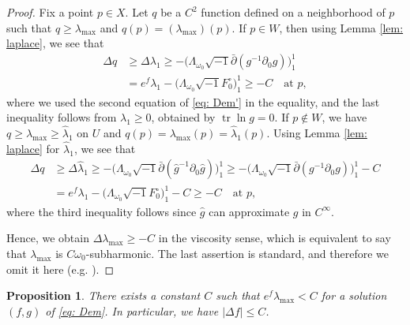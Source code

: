 \documentclass[a4, 12pt, 
]{amsart}
\numberwithin{equation}{section}
\theoremstyle{plain}
\newtheorem{prop}[equation]{Proposition}
\theoremstyle{definition}
\theoremstyle{remark}
\begin{document}
\begin{proof}
    
    Fix a point $p\in X$. Let $q$ be a $C^2$ function defined on a neighborhood of $p$ such that $q\ge\lambda_{\mathrm{max}}$ and $q(p)=(\lambda_{\mathrm{max}})(p)$. %
    If $p\in W$, then using Lemma \ref{lem: laplace}, we see that
    \begin{equation*}
    \begin{aligned}
        \Delta q
        &\ge \Delta\lambda_1\ge -\big(\Lambda_{\omega_0}\sqrt{-1}\bar{\partial}(g^{-1}\partial_0g)\big)^1_1\\
        &=e^f\lambda_1-\big(\Lambda_{\omega_0}\sqrt{-1}F^\circ_0\big)^1_1\ge -C \quad \text{at } p,
    \end{aligned}
    \end{equation*}
    where we used the second equation of \eqref{eq: Dem'} in the equality, and the last inequality follows from $\lambda_1\ge0$, obtained by $\operatorname{tr}\ln g=0$. If $p\notin W$, we have $q\ge\lambda_\mathrm{max}\ge\hat{\lambda}_1$ on $U$ and $q(p)=\lambda_\mathrm{max}(p)=\hat{\lambda}_1(p)$. Using Lemma \ref{lem: laplace} for $\hat{\lambda}_1$, we see that
    \begin{equation*}
        \begin{aligned}
            \Delta q
            &\ge \Delta\hat{\lambda}_1\ge -\big(\Lambda_{\omega_0}\sqrt{-1}\bar{\partial}(\hat{g}^{-1}\partial_0\hat{g})\big)^1_1\ge-\big(\Lambda_{\omega_0}\sqrt{-1}\bar{\partial}(g^{-1}\partial_0g)\big)^1_1-C\\
            &=e^f\lambda_1-\big(\Lambda_{\omega_0}\sqrt{-1}F^\circ_0\big)^1_1-C\ge -C \quad \text{at } p,
        \end{aligned}
    \end{equation*}
    where the third inequality follows since $\hat{g}$ can approximate $g$ in $C^\infty$.
    
    Hence, we obtain $\Delta \lambda_{\mathrm{max}}\ge-C$ in the viscosity sense, which is equivalent to say that $\lambda_{\mathrm{max}}$ is $C\omega_0$-subharmonic. The last assertion is standard, and therefore we omit it here (e.g. \cite[Theorem 1.46]{GZ}).
    \end{proof}

\begin{prop}\label{prop: keyest}
    There exists a constant $C$ such that $e^f \lambda_{\mathrm{max}} <C$ for a solution $(f,g)$ of \eqref{eq: Dem}. In particular, we have $|\Delta f|\le C$.
\end{prop}
\end{document}
